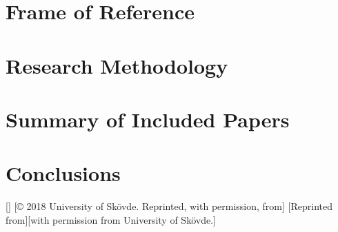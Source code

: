 \documentclass[english]{his-thesis}
\begin{document}
\part*{Frame of Reference}


\part*{Research Methodology}


\part*{Summary of Included Papers}


\part*{Conclusions}


\begin{backmatter}
    \begin{fullarticles}
        [\href{https://creativecommons.org/licenses/by-nc-nd/4.0/}{\ccbyncnd}]
        [\copyright{} 2018 University of Skövde. Reprinted, with permission, from]
        [Reprinted from][with permission from University of Skövde.]
    \end{fullarticles}
\end{backmatter}
\end{document}

